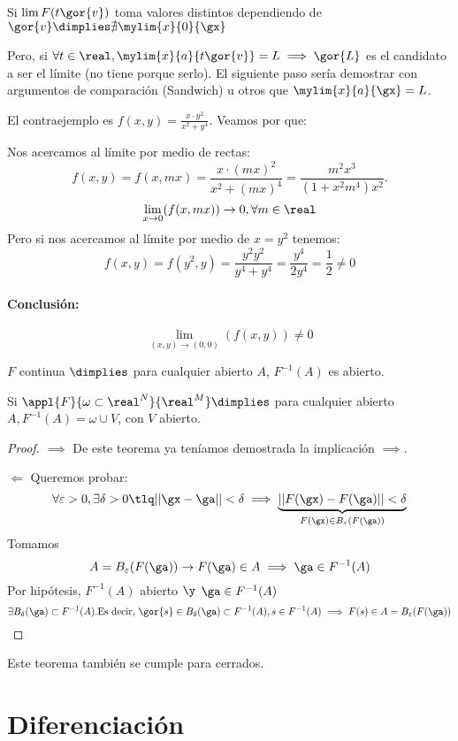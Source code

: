 \documentclass{apuntes}
\begin{document}
 Si $\displaystyle\lim F({t\gor{v}})$ toma valores distintos dependiendo de $\gor{v} \dimplies \nexists \displaystyle\mylim{x}{0}{\gx}$
 
 Pero, si $\forall t \in \real, \mylim{x}{a}{t\gor{v}} = L \implies \gor{L}$ es el candidato a ser el límite (no tiene porque serlo). El siguiente paso sería demostrar con argumentos de comparación (Sandwich) u otros que $\mylim{x}{a}{\gx} = L$.
 
 El contraejemplo es $f(x,y) = \frac{x\cdot y^2}{x^2 + y^4}$. Veamos por que:
 
 Nos acercamos al límite por medio de rectas:
 $$f(x,y) = f(x,mx) = \frac{x\cdot(mx)^2}{x^2 + (mx)^4} = \frac{m^2x^3}{(1 + x^2m^4)x^2}.$$
 $$\displaystyle\lim_{x\rightarrow 0} (f(x,mx)) \rightarrow 0, \forall m \in \real$$
 Pero si nos acercamos al límite por medio de $x = y^2$ tenemos:
 $$f(x,y) = f(y^2,y) = \frac{y^2y^2}{y^4+y^4} = \frac{y^4}{2y^4} = \frac{1}{2}\neq 0$$
 \paragraph{Conclusión:}
 
 $$\lim_{(x,y) \rightarrow (0,0)} (f(x,y)) \neq 0$$
 
 
\begin{theorem}
 $F$ continua $\dimplies$ para cualquier abierto $A$, $F^{-1}(A)$ es abierto.
\end{theorem}
\obs
Si $\appl{F}{\omega\subset\real^N}{\real^M} \dimplies$ para cualquier abierto $A, F^{-1}(A) = \omega \cup V$, con $V$ abierto.

\begin{proof}
$\implies$ De este teorema ya teníamos demostrada la implicación $\implies$.

$\Leftarrow$ Queremos probar: $$\forall \varepsilon > 0, \exists \delta>0 \tlq ||\gx-\ga||<\delta \implies \underbrace{||F(\gx)-F(\ga)||<\delta}_{F(\gx)\in B_{\varepsilon}(F(\ga))}$$
Tomamos  $$A = B_{\varepsilon}(F(\ga)) \rightarrow F(\ga) \in A \implies \ga \in F^{-1}(A)$$
Por hipótesis, $F^{-1}(A)$ abierto $\y$ $\ga \in F^{-1}(A)$
$$\exists B_{\delta}(\ga) \subset F^{-1}(A) \text{.Es decir, } \gor{s}\in B_{\delta}(\ga) \subset F^{-1}(A), s\in F^{-1}(A) \implies F(s) \in A = B_{\varepsilon}(F(\ga))$$

\end{proof}
\begin{remark}
Este teorema también se cumple para cerrados.
\end{remark}
\section{Diferenciación}
\end{document}
